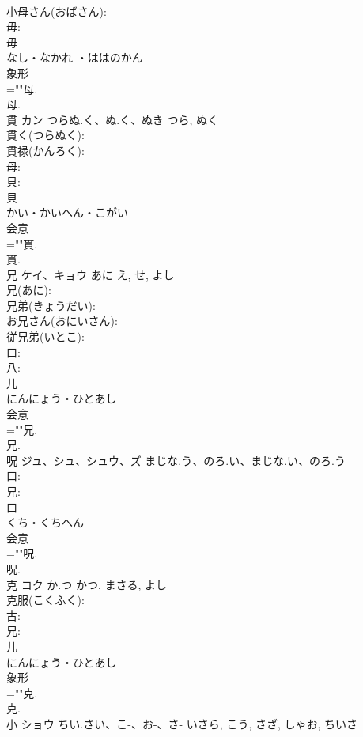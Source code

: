 \documentclass[8pt]{extreport}
\begin{document}
\begin{CJK}{UTF8}{min}
\\	小母さん(おばさん): 
\\	毋: 
\\	毋	
\\	なし・なかれ ・ははのかん	
\\	象形 
\\	=""母.
\\	母.
\\	貫	カン	つらぬ.く、ぬ.く、ぬき	つら, ぬく	
\\	貫く(つらぬく): 
\\	貫禄(かんろく): 
\\	母: 
\\	貝: 
\\	貝	
\\	かい・かいへん・こがい	
\\	会意 
\\	=""貫.
\\	貫.
\\	兄	ケイ、キョウ	あに	え, せ, よし	
\\	兄(あに): 
\\	兄弟(きょうだい): 
\\	お兄さん(おにいさん): 
\\	従兄弟(いとこ): 
\\	口: 
\\	八: 
\\	儿	
\\	にんにょう・ひとあし	
\\	会意 
\\	=""兄.
\\	兄.
\\	呪	ジュ、シュ、シュウ、ズ	まじな.う、のろ.い、まじな.い、のろ.う		
\\	口: 
\\	兄: 
\\	口	
\\	くち・くちへん	
\\	会意 
\\	=""呪.
\\	呪.
\\	克	コク	か.つ	かつ, まさる, よし	
\\	克服(こくふく): 
\\	古: 
\\	兄: 
\\	儿	
\\	にんにょう・ひとあし	
\\	象形 
\\	=""克.
\\	克.
\\	小	ショウ	ちい.さい、こ-、お-、さ-	いさら, こう, さざ, しゃお, ちいさ	

\end{CJK}
\end{document}
